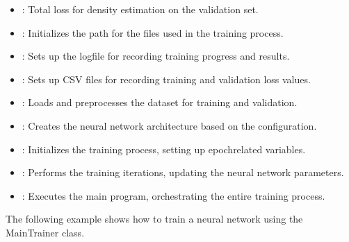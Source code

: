 \documentclass[letterpaper,10pt,english]{sphinxmanual}
\begin{document}
\begin{fulllineitems}
\begin{description}
\begin{itemize}
\item {} 
\sphinxAtStartPar
{}: Total loss for density estimation on the validation set.

\end{itemize}

\begin{itemize}
\item {} 
\sphinxAtStartPar
{}: Initializes the path for the files used in the training process.

\item {} 
\sphinxAtStartPar
{}: Sets up the logfile for recording training progress and results.

\item {} 
\sphinxAtStartPar
{}: Sets up CSV files for recording training and validation loss values.

\item {} 
\sphinxAtStartPar
{}: Loads and preprocesses the dataset for training and validation.

\item {} 
\sphinxAtStartPar
{}: Creates the neural network architecture based on the configuration.

\item {} 
\sphinxAtStartPar
{}: Initializes the training process, setting up epoch\sphinxhyphen{}related variables.

\item {} 
\sphinxAtStartPar
{}: Performs the training iterations, updating the neural network parameters.

\item {} 
\sphinxAtStartPar
{}: Executes the main program, orchestrating the entire training process.

\end{itemize}

\sphinxAtStartPar
The following example shows how to train a neural network using the MainTrainer class.


\end{description}
\end{fulllineitems}
\end{document}
